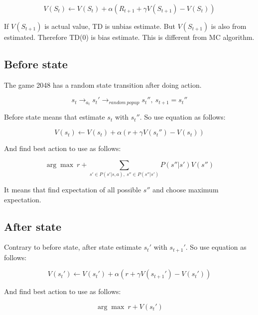 \documentclass[12pt]{article}
\begin{document}
\begin{equation}
V(S_t) \leftarrow V(S_t) + \alpha (R_{t+1} + \gamma V(S_{t+1}) - V(S_t) )
\end{equation}

If $V(S_{t+1})$ is actual value, TD is unbias estimate. But $V(S_{t+1})$ is also from estimated. Therefore TD(0) is bias estimate. This is different from MC algorithm.

\subsection{Before state}

The game 2048 has a random state transition after doing action. 

\begin{equation}
    s_t \longrightarrow_{a_t} s_t' \longrightarrow_{random \ popup} s_t''
    , \  s_{t+1} = s_t''
\end{equation}

Before state means that estimate $s_t$ with $s_t''$. So use equation as follows:

\begin{equation}
    V(s_t) \leftarrow V(s_t) + \alpha (r + \gamma V(s_t'') - V(s_t))
\end{equation}

And find best action to use as follows:

\begin{equation}
    \arg \max \  r + \sum_{s' \in  P(s' | s, a), \  s'' \in P(s'' | s' )} P(s'' | s') V(s'')
\end{equation}

It means that find expectation of all possible $s''$ and choose maximum  expectation.

\subsection{After state}

Contrary to before state, after state estimate $s_t'$ with $s_{t+1}'$. So use equation as follows:

\begin{equation}
    V(s_t') \leftarrow V(s_t') + \alpha (r + \gamma V(s_{t+1}') - V(s_t'))
\end{equation}

And find best action to use as follows:

\begin{equation}
    \arg \max \  r + V(s_t')
\end{equation}
\end{document}
